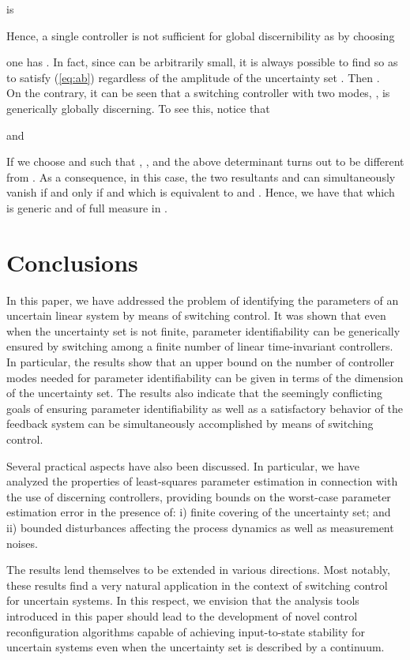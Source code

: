 \documentclass[letterpaper, 10 pt, conference]{ieeetran}
\begin{document}
is

Hence, a single controller is not sufficient for global discernibility as by choosing

one has . In fact, since  can be arbitrarily small, it is always possible to find  so as to satisfy (\ref{eq:ab}) regardless of the amplitude of the uncertainty set . Then . \\
On the contrary, it can be seen that a switching controller with two modes, , is generically globally discerning.
To see this, notice that

and

If we choose  and  such that  , , and  the above determinant turns out to be
different from . As a consequence, in this case, the two resultants  and  
can simultaneously vanish if and only if  and  which is equivalent to
 and . Hence, we have that  which is generic and of full measure in .

\section{Conclusions}

In this paper, we have addressed the problem of identifying the parameters of an uncertain 
linear system by means of switching control. 
It was shown that even when the uncertainty set is not finite, 
parameter identifiability can be generically ensured by 
switching among a finite number of linear time-invariant controllers. 
In particular, the results show that an upper bound on the number of controller modes needed for parameter identifiability can be given in terms of the dimension of the uncertainty set. 
The results also indicate that
the seemingly conflicting goals of ensuring parameter identifiability as well as a satisfactory behavior of the feedback system can be simultaneously accomplished by means of switching control. 

Several practical aspects have also been discussed. In particular, 
we have analyzed the properties of 
least-squares parameter estimation in connection with the use of discerning controllers,
providing bounds on the worst-case parameter estimation error
in the presence of: i) finite covering of the uncertainty set; and 
ii) bounded disturbances affecting the process dynamics as well as measurement noises. 
 
The results lend themselves to be extended in various directions.
Most notably, these results find a very natural application
in the context of switching control for uncertain systems. In this respect, 
we envision that the analysis tools introduced in this paper should 
lead to the development of novel control reconfiguration
algorithms capable of achieving input-to-state stability 
for uncertain systems even when the uncertainty set is described 
by a continuum.
\end{document}

